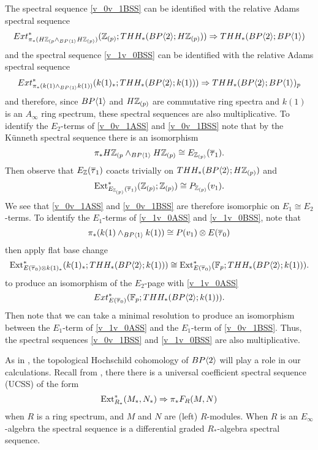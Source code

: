 The spectral sequence \eqref{v_0v_1BSS} can be identified with the relative Adams spectral sequence 
\begin{align}
	\label{v_0v_1ASS}Ext_{\pi_*(H\mathbb{Z}_{(p}\wedge_{BP\langle 1 \rangle} H\mathbb{Z}_{(p)})}^*(\mathbb{Z}_{(p)}; THH_*(BP\langle 2 \rangle;H\mathbb{Z}_{(p)})) \Rightarrow THH_*(BP\langle 2 \rangle;BP\langle 1 \rangle) 
\end{align}
and the spectral sequence \eqref{v_1v_0BSS} can be identified with the relative Adams spectral sequence 
\begin{align}
	\label{v_1v_0ASS}Ext_{\pi_*(k(1)\wedge_{BP\langle 1 \rangle} k(1))}^*(k(1)_*; THH_*(BP\langle 2 \rangle;k(1))) \Rightarrow THH_*(BP\langle 2 \rangle;BP\langle 1 \rangle)_p
\end{align}
and therefore, since $BP\langle 1 \rangle$ and $H\mathbb{Z}_{(p)}$ are commutative ring spectra and $k(1)$ is an $A_{\infty}$ ring spectrum, these spectral sequences are also multiplicative. To identify the $E_2$-terms of \eqref{v_0v_1ASS} and \eqref{v_0v_1BSS} note that by the K\"unneth spectral sequence there is an isomorphism
\[\pi_*H\mathbb{Z}_{(p}\wedge_{BP\langle 1 \rangle} H\mathbb{Z}_{(p)}\cong E_{\mathbb{Z}_{(p)}}(\overline{\tau}_1).\] 
Then observe that $E_{\mathbb{Z}}(\overline{\tau}_1)$ coacts trivially on $THH_*(BP\langle 2 \rangle;H\mathbb{Z}_{(p)})$ and 
\[ \operatorname{Ext}_{E_{\mathbb{Z}_{(p)}}(\overline{\tau}_1)}^*(\mathbb{Z}_{(p)};\mathbb{Z}_{(p)})\cong P_{\mathbb{Z}_{(p)}}(v_1). \]
We see that \eqref{v_0v_1ASS} and \eqref{v_0v_1BSS} are therefore isomorphic on $E_1\cong E_2$-terms. To identify the $E_1$-terms of \eqref{v_1v_0ASS} and \eqref{v_1v_0BSS}, note that 
\[ \pi_*(k(1)\wedge_{BP\langle 1 \rangle} k(1))\cong P(v_1)\otimes E(\overline{\tau}_0)\]
then apply flat base change 
\[ \operatorname{Ext}_{E(\overline{\tau}_0)\otimes k(1)_*}^*(k(1)_*; THH_*(BP\langle 2 \rangle;k(1)))\cong \operatorname{Ext}_{E(\overline{\tau}_0)}^*(\mathbb{F}_p; THH_*(BP\langle 2 \rangle;k(1))). \]
to produce an isomorphism of the $E_2$-page with \eqref{v_1v_0ASS}
\[ Ext_{E(\overline{\tau}_0)}^*(\mathbb{F}_p; THH_*(BP\langle 2 \rangle;k(1))). \]
Then note that we can take a minimal resolution to produce an isomorphism between the $E_1$-term of \eqref{v_1v_0ASS} and the $E_1$-term of \eqref{v_0v_1BSS}. Thus, the spectral sequences \eqref{v_0v_1BSS} and \eqref{v_1v_0BSS} are also multiplicative. 

As in \cite{AHL}, the topological Hochschild cohomology of $BP\langle 2 \rangle$ will play a role in our calculations. Recall from \cite{EKMM}, there there is a universal coefficient spectral sequence (UCSS) of the form
\begin{equation}\label{ucss} 
\operatorname{Ext}_{R_*}^*(M_* , N_*) \Rightarrow \pi_*F_{R}(M,N) 
\end{equation}
when $R$ is a ring spectrum, and $M$ and $N$ are (left) $R$-modules. When $R$ is an $E_{\infty}$-algebra the spectral sequence is a differential graded $R_*$-algebra spectral sequence. 

